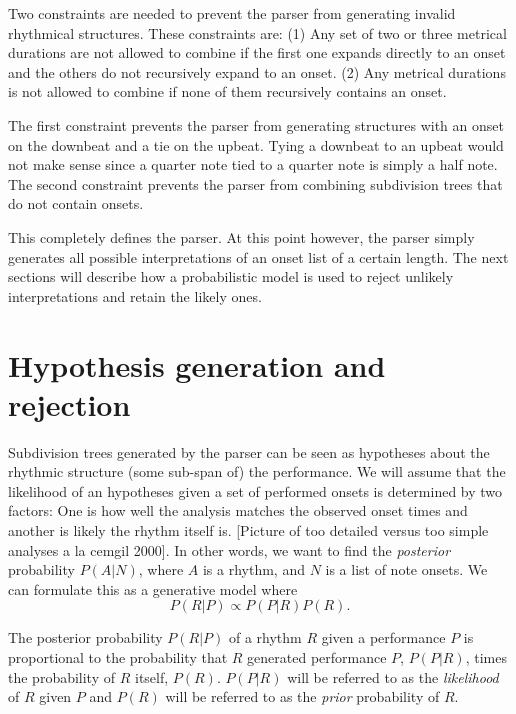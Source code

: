 Two constraints are needed to prevent the parser from generating invalid rhythmical structures. These constraints are: (1) Any set of two or three metrical durations are not allowed to combine if the first one expands directly to an onset and the others do not recursively expand to an onset. (2) Any metrical durations is not allowed to combine if none of them recursively contains an onset.

The first constraint prevents the parser from generating structures with an onset on the downbeat and a tie on the upbeat. Tying a downbeat to an upbeat would not make sense since a quarter note tied to a quarter note is simply a half note. The second constraint prevents the parser from combining subdivision trees that do not contain onsets.


This completely defines the parser. At this point however, the parser simply generates all possible interpretations of an onset list of a certain length. The next sections will describe how a probabilistic model is used to reject unlikely interpretations and retain the likely ones.

\section{Hypothesis generation and rejection}
\label{sec:rejection}

Subdivision trees generated by the parser can be seen as hypotheses about the rhythmic structure (some sub-span of) the performance. We will assume that the likelihood of an hypotheses given a set of performed onsets is determined by two factors: One is how well the analysis matches the observed onset times and another is likely the rhythm itself is. [Picture of too detailed versus too simple analyses a la cemgil 2000]. In other words, we want to find the \textit{posterior} probability $P(A|N)$, where $A$ is a rhythm, and $N$ is a list of note onsets. We can formulate this as a generative model where
\begin{equation}
\label{eq:model}
P(R|P) \propto P(P|R)P(R).
\end{equation}

The posterior probability $P(R|P)$ of a rhythm $R$ given a performance $P$ is proportional to the probability that $R$ generated performance $P$, $P(P|R)$, times the probability of $R$ itself, $P(R)$. $P(P|R)$ will be referred to as the \textit{likelihood} of $R$ given $P$ and $P(R)$ will be referred to as the \textit{prior} probability of $R$.

